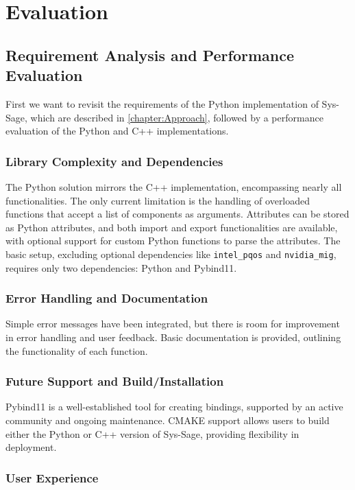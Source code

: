 \chapter{Evaluation}\label{chapter:Evaluation}
\section{Requirement Analysis and Performance Evaluation}
First we want to revisit the requirements of the Python implementation of Sys-Sage, which are described in \autoref{chapter:Approach}, followed by a performance evaluation of the Python and C++ implementations.
\subsection{Library Complexity and Dependencies}

The Python solution mirrors the C++ implementation, encompassing nearly all functionalities. The only current limitation is the handling of overloaded functions that accept a list of components as arguments. Attributes can be stored as Python attributes, and both import and export functionalities are available, with optional support for custom Python functions to parse the attributes. The basic setup, excluding optional dependencies like \texttt{intel\_pqos} and \texttt{nvidia\_mig}, requires only two dependencies: Python and Pybind11.

\subsection{Error Handling and Documentation}

Simple error messages have been integrated, but there is room for improvement in error handling and user feedback. Basic documentation is provided, outlining the functionality of each function.

\subsection{Future Support and Build/Installation}

Pybind11 is a well-established tool for creating bindings, supported by an active community and ongoing maintenance. CMAKE support allows users to build either the Python or C++ version of Sys-Sage, providing flexibility in deployment.

\subsection{User Experience}

